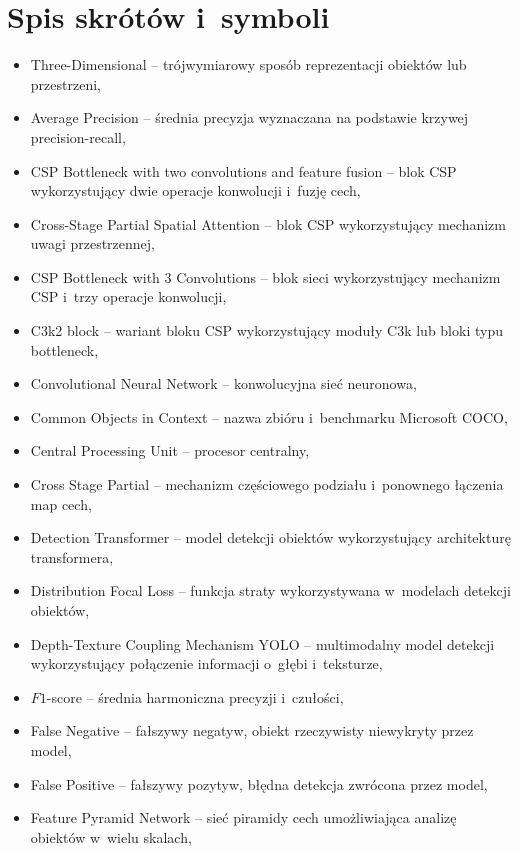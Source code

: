 \chapter{Spis skrótów i~symboli}

\begin{itemize}
    \item[3D] Three-Dimensional -- trójwymiarowy sposób reprezentacji obiektów lub przestrzeni,
    \item[AP] Average Precision -- średnia precyzja wyznaczana na podstawie krzywej precision-recall,
    \item[C2f] CSP Bottleneck with two convolutions and feature fusion -- blok CSP wykorzystujący dwie operacje konwolucji i~fuzję cech,
    \item[C2PSA] Cross-Stage Partial Spatial Attention -- blok CSP wykorzystujący mechanizm uwagi przestrzennej,
    \item[C3] CSP Bottleneck with 3 Convolutions -- blok sieci wykorzystujący mechanizm CSP i~trzy operacje konwolucji,
    \item[C3k2] C3k2 block -- wariant bloku CSP wykorzystujący moduły C3k lub bloki typu bottleneck,
    \item[CNN] Convolutional Neural Network -- konwolucyjna sieć neuronowa,
    \item[COCO] Common Objects in Context -- nazwa zbióru i~benchmarku Microsoft COCO,
    \item[CPU] Central Processing Unit -- procesor centralny,
    \item[CSP] Cross Stage Partial -- mechanizm częściowego podziału i~ponownego łączenia map cech,
    \item[DETR] Detection Transformer -- model detekcji obiektów wykorzystujący architekturę transformera,
    \item[DFL] Distribution Focal Loss -- funkcja straty wykorzystywana w~modelach detekcji obiektów,
    \item[DTC-YOLO] Depth-Texture Coupling Mechanism YOLO -- multimodalny model detekcji wykorzystujący połączenie informacji o~głębi i~teksturze,
    \item[F1] $F1$-score -- średnia harmoniczna precyzji i~czułości,
    \item[FN] False Negative -- fałszywy negatyw, obiekt rzeczywisty niewykryty przez model,
    \item[FP] False Positive -- fałszywy pozytyw, błędna detekcja zwrócona przez model,
    \item[FPN] Feature Pyramid Network -- sieć piramidy cech umożliwiająca analizę obiektów w~wielu skalach,

\end{itemize}

